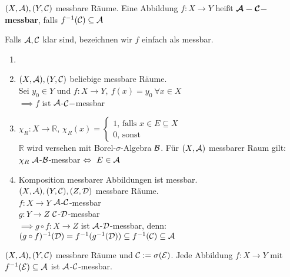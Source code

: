   \begin{definition}
    $(X, \mathcal{A}), (Y, \mathcal{C})$ messbare Räume. Eine Abbildung $f: X \to Y$ heißt $\bm{\mathcal{A}-\mathcal{C}-}$\textbf{messbar}, falls $f^{-1}(\mathcal{C}) \subseteq{\mathcal{A}}$
  \end{definition}

  \begin{notation}
    Falls $\mathcal{A}, \mathcal{C}$ klar sind, bezeichnen wir $f$ einfach als messbar. 
  \end{notation}

  \begin{example}
    \begin{enumerate}
      \item[]
      \item $(X, \mathcal{A}), (Y, \mathcal{C})$ beliebige messbare Räume.\\
            Sei $y_0 \in Y$ und $f: X \to Y, \ f(x) = y_0 \ \forall x \in X$\\
            $\implies f$ ist $\mathcal{A}$-$\mathcal{C}-$messbar
      \item $\chi_R: X \to \mathbb{R}$, $\chi_R(x) = \begin{cases} 1 \text{, falls } x \in E \subseteq X \\ 0 \text{, sonst}\end{cases}$\\
            $\mathbb{R}$ wird versehen mit Borel-$\sigma$-Algebra $\mathcal{B}$. Für $(X, \mathcal{A})$ messbarer Raum gilt:\\
            $\chi_R \ \mathcal{A}$-$\mathcal{B}$-messbar $\Leftrightarrow \ E \in \mathcal{A}$
      \item Komposition messbarer Abbildungen ist messbar.\\
            $(X, \mathcal{A}), (Y, \mathcal{C}), (Z, \mathcal{D})$ messbare Räume.\\
            $f:X  \to Y$ $\mathcal{A}$-$\mathcal{C}$-messbar\\
            $g:Y \to Z$ $\mathcal{C}$-$\mathcal{D}$-messbar\\
            $\implies g \circ f: X \to Z$ ist $\mathcal{A}$-$\mathcal{D}$-messbar, denn:\\
            $(g \circ f)^{-1}(\mathcal{D}) = f^{-1}(g^{-1}(\mathcal{D})) \subseteq f^{-1}(\mathcal{C}) \subseteq \mathcal{A}$
    \end{enumerate}
  \end{example}

  \begin{lemma}
    $(X, \mathcal{A}), (Y, \mathcal{C})$ messbare Räume und $\mathcal{C} := \sigma(\mathcal{E})$. Jede Abbildung $f: X \to Y$ mit $f^{-1}(\mathcal{E}) \subseteq \mathcal{A}$ ist $\mathcal{A}$-$\mathcal{C}$-messbar.
  \end{lemma}

